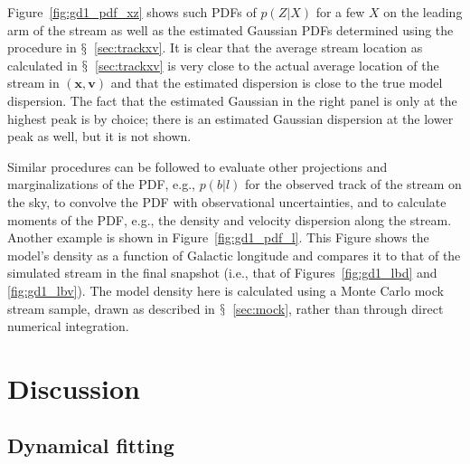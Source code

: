 \documentclass[12pt,preprint]{aastex}
\newcommand{\ie}{i.e.}
\newcommand{\eg}{e.g.}
\renewcommand{\figurename}{Figure}
\newcommand{\sectionname}{$\mathsection$}
\renewcommand{\vec}[1]{\ensuremath{\mathbf{#1}}}
\newcommand{\vecx}{\ensuremath{\vec{x}}}
\newcommand{\vecv}{\ensuremath{\vec{v}}}
\begin{document}
\figurename~\ref{fig:gd1_pdf_xz} shows such PDFs of $p(Z|X)$ for a few
$X$ on the leading arm of the stream as well as the estimated Gaussian
PDFs determined using the procedure in
\sectionname~\ref{sec:trackxv}. It is clear that the average stream
location as calculated in \sectionname~\ref{sec:trackxv} is very close
to the actual average location of the stream in $(\vecx,\vecv)$ and
that the estimated dispersion is close to the true model
dispersion. The fact that the estimated Gaussian in the right panel is
only at the highest peak is by choice; there is an estimated Gaussian
dispersion at the lower peak as well, but it is not shown.

Similar procedures can be followed to evaluate other projections and
marginalizations of the PDF, \eg, $p(b|l)$ for the observed track of
the stream on the sky, to convolve the PDF with observational
uncertainties, and to calculate moments of the PDF, \eg, the density
and velocity dispersion along the stream. Another example is shown in
\figurename~\ref{fig:gd1_pdf_l}. This Figure shows the model's density
as a function of Galactic longitude and compares it to that of the
simulated stream in the final snapshot (\ie, that of
\figurename s~\ref{fig:gd1_lbd} and \ref{fig:gd1_lbv}). The model
density here is calculated using a Monte Carlo mock stream sample,
drawn as described in \sectionname~\ref{sec:mock}, rather than through
direct numerical integration. 


\section{Discussion}\label{sec:discussion}

\subsection{Dynamical fitting}
\end{document}

